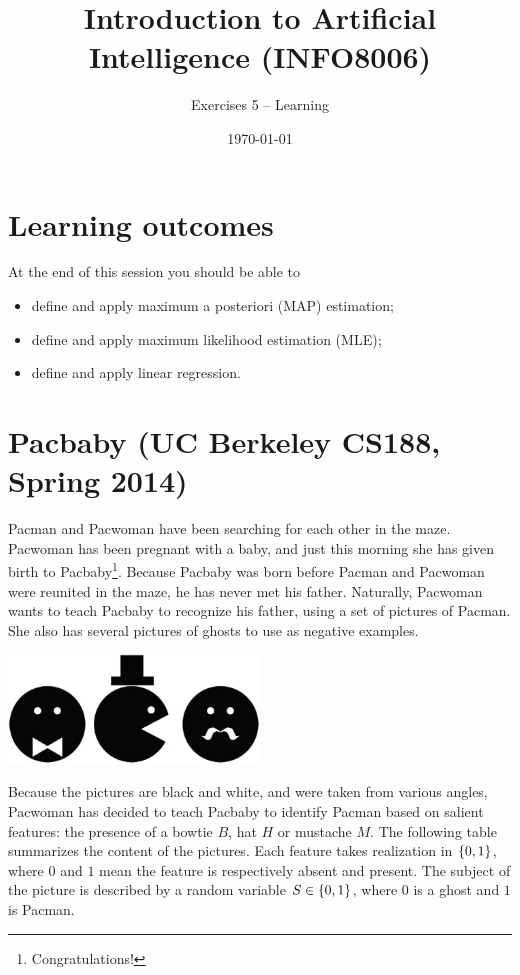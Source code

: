 \documentclass[11pt, a4paper]{article}
\title{Introduction to Artificial Intelligence (INFO8006)}
\subtitle{Exercises 5 -- Learning}
\date{\today}
\begin{document}
\maketitle

\section*{Learning outcomes}

At the end of this session you should be able to
\begin{itemize}[noitemsep]
    \item define and apply maximum a posteriori (MAP) estimation;
    \item define and apply maximum likelihood estimation (MLE);
    \item define and apply linear regression.
\end{itemize}

\section{Pacbaby (UC Berkeley CS188, Spring 2014)}

Pacman and Pacwoman have been searching for each other in the maze. Pacwoman has been pregnant with a baby, and just this morning she has given birth to Pacbaby\footnote{Congratulations!}. Because Pacbaby was born before Pacman and Pacwoman were reunited in the maze, he has never met his father. Naturally, Pacwoman wants to teach Pacbaby to recognize his father, using a set of pictures of Pacman. She also has several pictures of ghosts to use as negative examples.

\begin{center}
    \includegraphics[width=0.5\textwidth]{figures/e5_pacbaby.jpg}
\end{center}

Because the pictures are black and white, and were taken from various angles, Pacwoman has decided to teach Pacbaby to identify Pacman based on salient features: the presence of a bowtie $B$, hat $H$ or mustache $M$. The following table summarizes the content of the pictures. Each feature takes realization in $\{0, 1\}$, where $0$ and $1$ mean the feature is respectively absent and present. The subject of the picture is described by a random variable $S \in \{0, 1\}$, where $0$ is a ghost and $1$ is Pacman.
\end{document}
